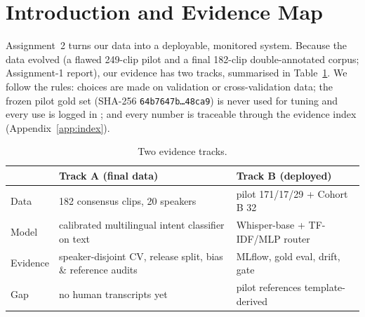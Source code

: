 \documentclass[sigconf,authordraft]{acmart}
\begin{document}
\maketitle

\section{Introduction and Evidence Map}\label{sec:intro}
Assignment~2 turns our data into a deployable, monitored system. Because the data evolved (a flawed 249-clip pilot and a final 182-clip double-annotated corpus; Assignment-1 report), our evidence has two tracks, summarised in Table~\ref{tab:tracks}. We follow the rules: choices are made on validation or cross-validation data; the frozen pilot gold set (SHA-256 \texttt{64b7647b\ldots 48ca9}) is never used for tuning and every use is logged in ; and every number is traceable through the evidence index (Appendix~\ref{app:index}).
\begin{table}[htbp]
\caption{Two evidence tracks.}\label{tab:tracks}
\begin{tabular}{p{1.15cm}p{2.9cm}p{2.9cm}}
\toprule & Track A (final data) & Track B (deployed) \\ \midrule
Data & 182 consensus clips, 20 speakers & pilot 171/17/29 + Cohort B 32 \\
Model & calibrated multilingual intent classifier on text & Whisper-base + TF-IDF/MLP router \\
Evidence & speaker-disjoint CV, release split, bias \& reference audits & MLflow, gold eval, drift, gate \\
Gap & no human transcripts yet & pilot references template-derived \\ \bottomrule
\end{tabular}
\end{table}
\end{document}
